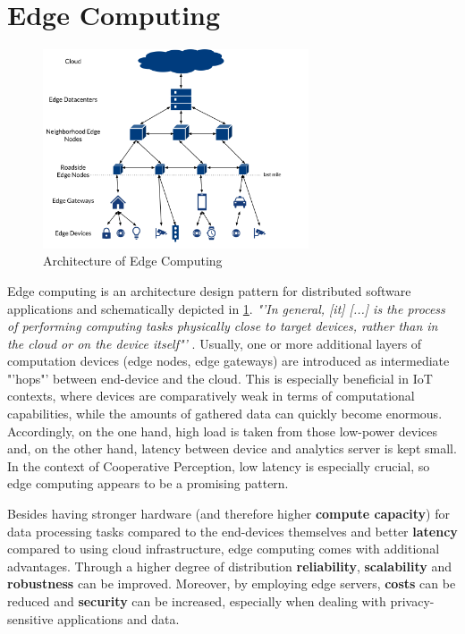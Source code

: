 \section{Edge Computing}
\label{sec:background:edge_computing}

\begin{figure}
	\centering
	\includegraphics[width=0.7\textwidth]{98_images/edge.png}
	\caption[Architecture of Edge Computing]{Architecture of Edge Computing \cite{Bischoff2019}}
	\label{fig:edge_computing}
\end{figure}

Edge computing is an architecture design pattern for distributed software applications and schematically depicted in \cref{fig:edge_computing}. \textit{"'In general, [it] [...] is the process of performing computing tasks physically close to target devices, rather than in the cloud or on the device itself"'} \cite{Bischoff2019}. Usually, one or more additional layers of computation devices (edge nodes, edge gateways) are introduced as intermediate "'hops"' between end-device and the cloud. This is especially beneficial in IoT contexts, where devices are comparatively weak in terms of computational capabilities, while the amounts of gathered data can quickly become enormous. Accordingly, on the one hand, high load is taken from those low-power devices and, on the other hand, latency between device and analytics server is kept small. In the context of Cooperative Perception, low latency is especially crucial, so edge computing appears to be a promising pattern.

Besides having stronger hardware (and therefore higher \textbf{compute capacity}) for data processing tasks compared to the end-devices themselves and better \textbf{latency} compared to using cloud infrastructure, edge computing comes with additional advantages. Through a higher degree of distribution \textbf{reliability}, \textbf{scalability} and \textbf{robustness} can be improved. Moreover, by employing edge servers, \textbf{costs} can be reduced and \textbf{security} can be increased, especially when dealing with privacy-sensitive applications and data. 

